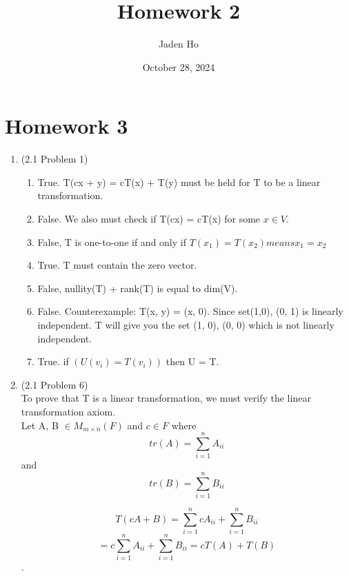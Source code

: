 \documentclass[12pt]{article}
\title{Homework 2}
\author{Jaden Ho}
\date{October 28, 2024}
\begin{document}
\maketitle

\section{Homework 3}

\begin{enumerate}
    \item (2.1 Problem 1)
        \begin{enumerate}[label=(\alph*)]
            \item True. T(cx + y) = cT(x) + T(y) must be held for T to be a linear transformation.
            \item False. We also must check if T(cx) = cT(x) for some $x \in V$. 
            \item False, T is one-to-one if and only if $T(x_1) = T(x_2) means x_1 = x_2$
            \item True. T must contain the zero vector. 
            \item False, nullity(T) + rank(T) is equal to dim(V). 
            \item False. Counterexample: T(x, y) = (x, 0). Since set{(1,0), (0, 1)} is linearly independent. T will give you the set {(1, 0), (0, 0)} which is not linearly independent. 
            \item True. if $(U(v_i) = T(v_i))$ then U = T.  
            
        \end{enumerate} 
    \item (2.1 Problem 6)\\
        To prove that T is a linear transformation, we must verify the linear transformation axiom. \\
        Let A, B $\in M_{m \times n}(F)$ and $c \in F$ where 
        \begin{equation}
            tr(A) = \sum_{i=1}^{n} A_{ii}
        \end{equation}
        and 
        \begin{equation}
            tr(B) = \sum_{i=1}^{n} B_{ii}
        \end{equation}

        \begin{equation}
            T(cA + B) =  \sum_{i=1}^{n} cA_{ii} + \sum_{i=1}^{n} B_{ii}
        \end{equation}
        \begin{equation}
            = c\sum_{i=1}^{n} A_{ii} + \sum_{i=1}^{n} B_{ii} = cT(A) + T(B)
        \end{equation}. 


\end{enumerate}
\end{document}
